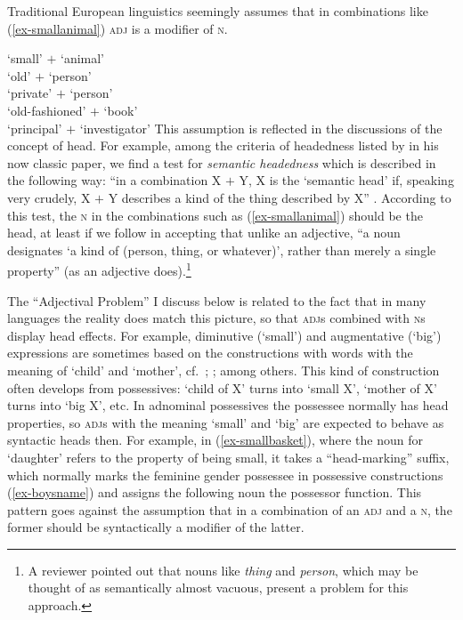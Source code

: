 \documentclass[output=paper
  ,nobabel
  ,draftmode
  ,colorlinks, citecolor=brown
]{langscibook}
\begin{document}
Traditional European linguistics seemingly assumes that in combinations like (\ref{ex-smallanimal}) \textsc{adj} is a modifier of \textsc{n}.

\eal\label{ex-smallanimal}
\ex `small' $+$ `animal' \\ 
\ex `old' $+$ `person'\\
\ex `private' $+$ `person' \\ 
\ex `old-fashioned' $+$ `book'\\
\ex `principal' $+$ `investigator'
\zl
This assumption is reflected in the discussions of the concept of head. For example, among the
criteria of headedness listed by \citet{Zwicky85a} in his now classic paper, we find a test for
\emph{semantic headedness} which is described in the following way: ``in a combination X $+$ Y, X is
the `semantic head' if, speaking very crudely, X $+$ Y describes a kind of the thing described by X''
\citep[4]{Zwicky85a}. According to this test, the \textsc{n} in the combinations such as
(\ref{ex-smallanimal}) should be the head, at least if we follow \citet*[359]{Wierzbicka1986} in
accepting that unlike an adjective, ``a noun designates `a kind of (person, thing, or whatever)',
rather than merely a single property'' (as an adjective does).\footnote{A reviewer pointed out that
  nouns like \emph{thing} and \emph{person}, which may be thought of as semantically almost vacuous, present a
  problem for this approach.} 

The ``Adjectival Problem'' I discuss below is related to the fact that
in many languages the reality does match this picture, so that \textsc{adj}s combined with
\textsc{n}s display head effects. For example, diminutive (`small') and augmentative (`big')
expressions are sometimes based on the constructions with words with the meaning of `child’ and
`mother’, cf.\ \citet{Matisoff1992}; \citet{Jurafsky1996}; \citet*[65--67]{HeineKuteva2002} among
others. This kind of construction often develops from possessives: `child of X' turns into `small
X', `mother of X' turns into `big X', etc. In adnominal possessives the possessee normally has head
properties, so \textsc{adj}s with the meaning `small' and `big' are expected to behave as syntactic
heads then. For example, in (\ref{ex-smallbasket}), where the noun for `daughter' refers to the
property of being small, it takes a ``head-marking'' suffix, which normally marks the feminine
gender possessee in possessive constructions (\ref{ex-boysname}) and assigns the following noun the
possessor function. This pattern goes against the assumption that in a combination of an
\textsc{adj} and a \textsc{n}, the former should be syntactically a modifier of the latter. 
\end{document}
